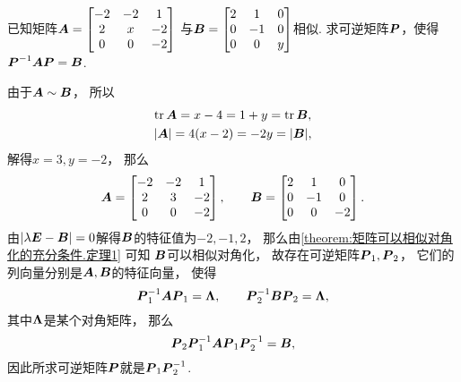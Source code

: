 \begin{example}
已知矩阵\(\boldsymbol{A} = \begin{bmatrix}
	-2 & -2 & 1 \\
	2 & x & -2 \\
	0 & 0 & -2
\end{bmatrix}\)
与\(\boldsymbol{B} = \begin{bmatrix}
	2 & 1 & 0 \\
	0 & -1 & 0 \\
	0 & 0 & y
\end{bmatrix}\)相似.
求可逆矩阵\(\boldsymbol{P}\)，使得\(\boldsymbol{P}^{-1} \boldsymbol{A} \boldsymbol{P} = \boldsymbol{B}\).
\begin{solution}
由于\(\boldsymbol{A} \sim \boldsymbol{B}\)，
所以\begin{gather*}
	\tr\boldsymbol{A} = x - 4 = 1 + y = \tr\boldsymbol{B}, \\
	\abs{\boldsymbol{A}} = 4(x-2) = -2y = \abs{\boldsymbol{B}},
\end{gather*}
解得\(x=3,
y=-2\)，
那么\begin{equation*}
	\boldsymbol{A} = \begin{bmatrix}
		-2 & -2 & 1 \\
		2 & 3 & -2 \\
		0 & 0 & -2
	\end{bmatrix},
	\qquad
	\boldsymbol{B} = \begin{bmatrix}
		2 & 1 & 0 \\
		0 & -1 & 0 \\
		0 & 0 & -2
	\end{bmatrix}.
\end{equation*}
由\(\abs{\lambda\boldsymbol{E}-\boldsymbol{B}}=0\)解得\(\boldsymbol{B}\)的特征值为\(-2,-1,2\)，
那么由\cref{theorem:矩阵可以相似对角化的充分条件.定理1} 可知
\(\boldsymbol{B}\)可以相似对角化，
故存在可逆矩阵\(\boldsymbol{P}_1,\boldsymbol{P}_2\)，
它们的列向量分别是\(\boldsymbol{A},\boldsymbol{B}\)的特征向量，
使得\begin{equation*}
	\boldsymbol{P}_1^{-1} \boldsymbol{A} \boldsymbol{P}_1 = \boldsymbol\Lambda,
	\qquad
	\boldsymbol{P}_2^{-1} \boldsymbol{B} \boldsymbol{P}_2 = \boldsymbol\Lambda,
\end{equation*}
其中\(\boldsymbol\Lambda\)是某个对角矩阵，
那么\begin{equation*}
	\boldsymbol{P}_2 \boldsymbol{P}_1^{-1} \boldsymbol{A} \boldsymbol{P}_1 \boldsymbol{P}_2^{-1} = \boldsymbol{B},
\end{equation*}
因此所求可逆矩阵\(\boldsymbol{P}\)就是\(\boldsymbol{P}_1 \boldsymbol{P}_2^{-1}\).


\end{solution}
\end{example}
